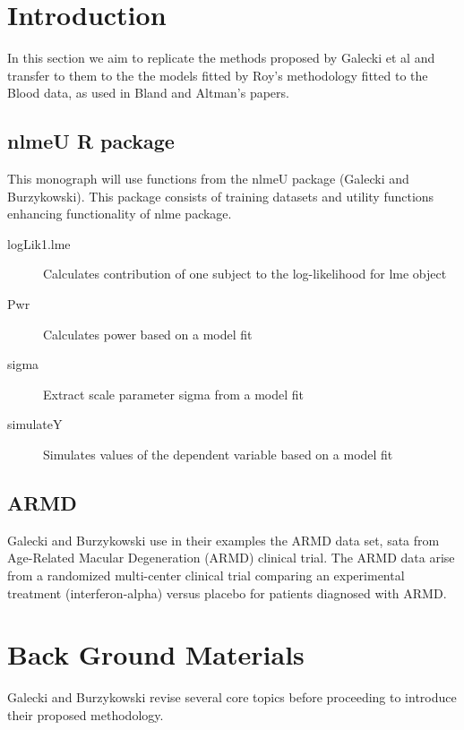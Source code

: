 \documentclass[a4paper,12pt]{article}
\begin{document}
 	\tableofcontents

\section{Introduction}
In this section we aim to replicate the methods proposed by Galecki et al and transfer to them to the
the models fitted by Roy's methodology fitted to the Blood data, as used in Bland and Altman's papers.

\subsection{nlmeU R package}

This monograph will use functions from the nlmeU package (Galecki and Burzykowski). This package consists of training datasets and utility functions enhancing functionality of nlme package.

\begin{description}
\item[logLik1.lme] Calculates contribution of one subject to the log-likelihood for lme
object

\item[Pwr] Calculates power based on a model fit

\item[sigma] Extract scale parameter sigma from a model fit

\item[simulateY] Simulates values of the dependent variable based on a model fit

\end{description}

\subsection{ARMD}
Galecki and Burzykowski use in their examples the ARMD data set, sata from Age-Related Macular Degeneration (ARMD) clinical trial. The ARMD data arise from a randomized multi-center clinical trial comparing an experimental treatment (interferon-alpha) versus placebo for patients diagnosed with ARMD.


\newpage
\section{Back Ground Materials}
Galecki and Burzykowski revise several core topics before proceeding to introduce their proposed methodology.
\end{document}

